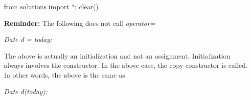 \begin{python0}
from solutions import *; clear()
\end{python0}

\textbf{Reminder:} The following does not call \textit{operator=}

\textit{Date d = today;}

The above is actually an initialization and not an assignment.
Initialization always involves the constructor. In the above case, the
copy constructor is called. In other words, the above is the same as

\textit{Date d(today);}


